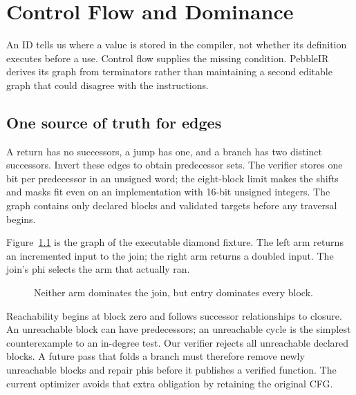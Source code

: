 \chapter{Control Flow and Dominance}
\label{ch:pebble-dominance}

An ID tells us where a value is stored in the compiler, not whether its definition executes before a use.
Control flow supplies the missing condition.
PebbleIR derives its graph from terminators rather than maintaining a second editable graph that could disagree with the instructions.

\section{One source of truth for edges}
\label{sec:pebble-edges}
A return has no successors, a jump has one, and a branch has two distinct successors.
Invert these edges to obtain predecessor sets.
The verifier stores one bit per predecessor in an unsigned word; the eight-block limit makes the shifts and masks fit even on an implementation with 16-bit unsigned integers.
The graph contains only declared blocks and validated targets before any traversal begins.

Figure~\ref{fig:pebble-diamond} is the graph of the executable diamond fixture.
The left arm returns an incremented input to the join; the right arm returns a doubled input.
The join's phi selects the arm that actually ran.

\begin{figure}[htbp]
\centering
{}
\caption{Neither arm dominates the join, but entry dominates every block.}
\label{fig:pebble-diamond}
\end{figure}

Reachability begins at block zero and follows successor relationships to closure.
An unreachable block can have predecessors; an unreachable cycle is the simplest counterexample to an in-degree test.
Our verifier rejects all unreachable declared blocks.
A future pass that folds a branch must therefore remove newly unreachable blocks and repair phis before it publishes a verified function.
The current optimizer avoids that extra obligation by retaining the original CFG.

